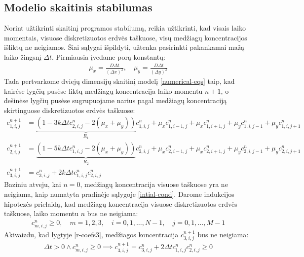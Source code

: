 \subsection{Modelio skaitinis stabilumas}

Norint užtikrinti skaitinį programos stabilumą, reikia užtikrinti, kad visais laiko momentais, visuose diskretizuotos erdvės taškuose, visų medžiagų koncentracijos išliktų ne neigiamos. Šiai sąlygai išpildyti, užtenka pasirinkti pakankamai mažą laiko žingsnį $\Delta t$. Pirmiausia įvedame porą konstantų:
\begin{align*}
\mu_x = \frac{D\Delta t}{(\Delta x)^2}, \quad
\mu_y = \frac{D\Delta t}{(\Delta y)^2}
\end{align*}
Tada pertvarkome dviejų dimensijų skaitinį modelį \eqref{numerical-eqs} taip, kad kairėse lygčių pusėse liktų medžiagų koncentracija laiko momentu $n+1$, o dešinėse lygčių pusėse sugrupuojame narius pagal medžiagų koncentraciją skirtinguose diskretizuotos erdvės taškuose:
\begin{subequations} \label{eqs:r-coefs}
  \begin{align}
  c^{n+1}_{1,i,j}&=\underbrace{(1-3k\Delta tc^{n}_{2,i,j}-2(\mu_x+\mu_y))}_{R_1}c^n_{1,i,j}+\mu_xc^n_{1,i-1,j}+\mu_xc^n_{1,i+1,j}+\mu_yc^n_{1,i,j-1}+\mu_yc^n_{1,i,j+1} \label{r-coefs1}\\
  c^{n+1}_{2,i,j}&=\underbrace{(1-5k\Delta tc^{n}_{1,i,j}-2(\mu_x+\mu_y))}_{R_2}c^n_{2,i,j}+\mu_xc^n_{2,i-1,j}+\mu_xc^n_{2,i+1,j}+\mu_yc^n_{2,i,j-1}+\mu_yc^n_{2,i,j+1} \label{r-coefs2}\\
  c^{n+1}_{3,i,j}&=c^n_{3,i,j}+2k\Delta tc^{n}_{1,i,j}c^{n}_{2,i,j} \label{r-coefs3}
  \end{align}
\end{subequations}
Baziniu atveju, kai $n=0$, medžiagų koncentracija visuose taškuose yra ne neigiama, kaip numatyta pradinėje sąlygoje \eqref{intial-cond}. Darome indukcijos hipotezės prielaidą, kad medžiagų koncentracija visuose diskretizuotos erdvės taškuose, laiko momentu $n$ bus ne neigiama:
\begin{align} \label{induction-assumption}
  c^n_{m,i,j} \geqslant 0, \quad m=1,2,3,\quad i=0,1,\dots,N-1,\quad j=0,1,\dots,M-1
\end{align}
Akivaizdu, kad lygtyje \eqref{r-coefs3}, medžiagos koncentracija $c^{n+1}_{3,i,j}$ bus ne neigiama:
\begin{align*}
  \Delta t > 0 \land c^n_{m,i,j}\geqslant 0 \implies c^{n+1}_{3,i,j}=c^n_{3,i,j}+2\Delta tc^{n}_{1,i,j}c^{n}_{2,i,j}\geqslant 0 
\end{align*}
